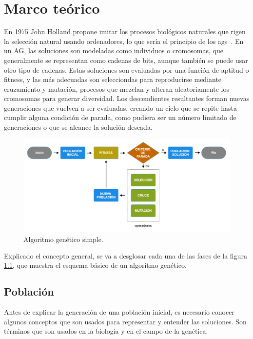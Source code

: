 \chapter{Marco teórico}
\label{ch:marco-teorico}

En 1975 John Holland propone imitar los procesos biológicos naturales que rigen la selección natural usando ordenadores, lo que sería el principio de los \glspl{ag}~\cite{holland1975}. En un AG, las soluciones son modeladas como individuos o cromosomas, que generalmente se representan como cadenas de bits, aunque también se puede usar otro tipo de cadenas. Estas soluciones son evaluadas por una función de aptitud o fitness, y las más adecuadas son selecciondas para reproducirse mediante cruzamiento y mutación, procesos que mezclan y alteran aleatoriamente los cromosomas para generar diversidad. Los descendientes resultantes forman nuevas generaciones que vuelven a ser evaluadas, creando un ciclo que se repite hasta cumplir alguna condición de parada, como pudiera ser un número limitado de generaciones o que se alcance la solución deseada.

\begin{figure}[H]
    \centering
    \includegraphics[width=1\textwidth]{figures/algoritmo-genetico.png}
    \caption{Algoritmo genético simple.}
    \label{fig:algoritmo-genetico}
  \end{figure}

Explicado el concepto general, se va a desglosar cada una de las fases de la figura \ref{fig:algoritmo-genetico}, que muestra el esquema básico de un algoritmo genético.

\section{Población}

Antes de explicar la generación de una población inicial, es necesario conocer algunos conceptos que son usados para representar y entender las soluciones. Son términos que son usados en la biología y en el campo de la genética. 


